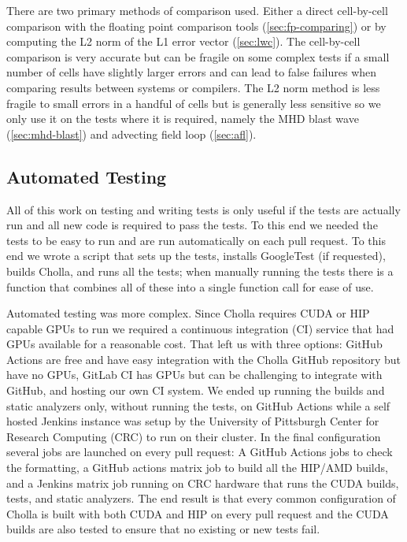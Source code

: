 There are two primary methods of comparison used. Either a direct cell-by-cell comparison with the floating point comparison tools (\autoref{sec:fp-comparing}) or by computing the L2 norm of the L1 error vector (\autoref{sec:lwc}). The cell-by-cell comparison is very accurate but can be fragile on some complex tests if a small number of cells have slightly larger errors and can lead to false failures when comparing results between systems or compilers. The L2 norm method is less fragile to small errors in a handful of cells but is generally less sensitive so we only use it on the tests where it is required, namely the MHD blast wave (\autoref{sec:mhd-blast}) and advecting field loop (\autoref{sec:afl}).

\subsection{Automated Testing}

All of this work on testing and writing tests is only useful if the tests are actually run and all new code is required to pass the tests. To this end we needed the tests to be easy to run and are run automatically on each pull request. To this end we wrote a script that sets up the tests, installs GoogleTest (if requested), builds Cholla, and runs all the tests; when manually running the tests there is a function that combines all of these into a single function call for ease of use. 

Automated testing was more complex. Since Cholla requires CUDA or HIP capable GPUs to run we required a continuous integration (CI) service that had GPUs available for a reasonable cost. That left us with three options: GitHub Actions are free and have easy integration with the Cholla GitHub repository but have no GPUs, GitLab CI has GPUs but can be challenging to integrate with GitHub, and hosting our own CI system. We ended up running the builds and static analyzers only, without running the tests, on GitHub Actions while a self hosted Jenkins instance was setup by the University of Pittsburgh Center for Research Computing (CRC) to run on their cluster. In the final configuration several jobs are launched on every pull request: A GitHub Actions jobs to check the formatting, a GitHub actions matrix job to build all the HIP/AMD builds, and a Jenkins matrix job running on CRC hardware that runs the CUDA builds, tests, and static analyzers. The end result is that every common configuration of Cholla is built with both CUDA and HIP on every pull request and the CUDA builds are also tested to ensure that no existing or new tests fail. 



